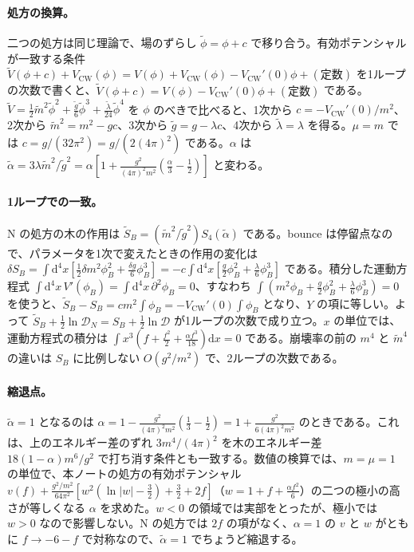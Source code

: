 \documentclass[a4paper,10pt]{ltjsarticle}
\newcommand{\dd}{\mathrm{d}}
\begin{document}
\paragraph{処方の換算。}二つの処方は同じ理論で、場のずらし $\tilde\phi=\phi+c$ で移り合う。有効ポテンシャルが一致する条件 $\tilde V(\phi+c)+V_{\mathrm{CW}}(\phi)=V(\phi)+V_{\mathrm{CW}}(\phi)-V_{\mathrm{CW}}'(0)\phi+(\text{定数})$ を1ループの次数で書くと、$\tilde V(\phi+c)=V(\phi)-V_{\mathrm{CW}}'(0)\phi+(\text{定数})$ である。$\tilde V=\frac12\tilde m^2\tilde\phi^2+\frac{\tilde g}6\tilde\phi^3+\frac{\tilde\lambda}{24}\tilde\phi^4$ を $\phi$ のべきで比べると、1次から $c=-V_{\mathrm{CW}}'(0)/m^2$、2次から $\tilde m^2=m^2-gc$、3次から $\tilde g=g-\lambda c$、4次から $\tilde\lambda=\lambda$ を得る。$\mu=m$ では $c=g/(32\pi^2)=g/(2(4\pi)^2)$ である。$\alpha$ は $\tilde\alpha=3\lambda\tilde m^2/\tilde g^2=\alpha[1+\frac{g^2}{(4\pi)^2m^2}(\frac\alpha3-\frac12)]$ と変わる。

\paragraph{1ループでの一致。}N の処方の木の作用は $\tilde S_B=(\tilde m^2/\tilde g^2)S_4(\tilde\alpha)$ である。bounce は停留点なので、パラメータを1次で変えたときの作用の変化は $\delta S_B=\int\dd^4x[\frac12\delta m^2\phi_B^2+\frac{\delta g}6\phi_B^3]=-c\int\dd^4x[\frac g2\phi_B^2+\frac\lambda6\phi_B^3]$ である。積分した運動方程式 $\int\dd^4x\,V'(\phi_B)=\int\dd^4x\,\partial^2\phi_B=0$、すなわち $\int(m^2\phi_B+\frac g2\phi_B^2+\frac\lambda6\phi_B^3)=0$ を使うと、$\tilde S_B-S_B=cm^2\int\phi_B=-V_{\mathrm{CW}}'(0)\int\phi_B$ となり、$Y$ の項に等しい。よって $\tilde S_B+\frac12\ln\mathcal D_N=S_B+\frac12\ln\mathcal D$ が1ループの次数で成り立つ。$x$ の単位では、運動方程式の積分は $\int x^3(f+\frac{f^2}2+\frac{\alpha f^3}{18})\dd x=0$ である。崩壊率の前の $m^4$ と $\tilde m^4$ の違いは $S_B$ に比例しない $O(g^2/m^2)$ で、2ループの次数である。

\paragraph{縮退点。}$\tilde\alpha=1$ となるのは $\alpha=1-\frac{g^2}{(4\pi)^2m^2}(\frac13-\frac12)=1+\frac{g^2}{6(4\pi)^2m^2}$ のときである。これは、上のエネルギー差のずれ $3m^4/(4\pi)^2$ を木のエネルギー差 $18(1-\alpha)m^6/g^2$ で打ち消す条件とも一致する。数値の検算では、$m=\mu=1$ の単位で、本ノートの処方の有効ポテンシャル $v(f)+\frac{g^2/m^2}{64\pi^2}[w^2(\ln|w|-\frac32)+\frac32+2f]$（$w=1+f+\frac{\alpha f^2}6$）の二つの極小の高さが等しくなる $\alpha$ を求めた。$w<0$ の領域では実部をとったが、極小では $w>0$ なので影響しない。N の処方では $2f$ の項がなく、$\alpha=1$ の $v$ と $w$ がともに $f\to-6-f$ で対称なので、$\tilde\alpha=1$ でちょうど縮退する。
\end{document}
